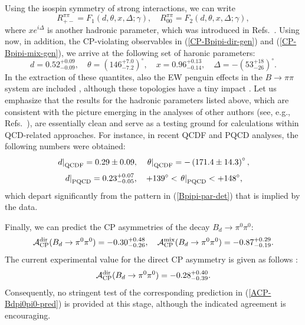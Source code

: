 \documentclass[12pt]{article}
\begin{document}
Using the isospin symmetry of strong interactions, we can write
\begin{equation}\label{Rpipi-gen}
R_{+-}^{\pi\pi}=F_1(d,\theta,x,\Delta;\gamma), \quad
R_{00}^{\pi\pi}=F_2(d,\theta,x,\Delta;\gamma),
\end{equation}
where $xe^{i\Delta}$ is another hadronic parameter, which was introduced
in Refs.~\cite{BFRS2,BFRS3}. Using now, in addition, the CP-violating observables in
(\ref{CP-Bpipi-dir-gen}) and (\ref{CP-Bpipi-mix-gen}), we arrive at the following 
set of haronic parameters:
\begin{equation}\label{Bpipi-par-det}
d=0.52^{+0.09}_{-0.09}, \quad
\theta=(146^{+7.0}_{-7.2})^\circ, \quad
x=0.96^{+0.13}_{-0.14}, \quad
\Delta=-(53^{+18}_{-26})^\circ.
\end{equation}
In the extraction of these quantites, also the EW penguin effects in the 
$B\to\pi\pi$ system are included \cite{BF98,GPY}, although these topologies have a 
tiny impact \cite{PAPIII}. Let us emphasize that the results for the hadronic 
parameters listed above, which are consistent with the picture emerging in the 
analyses of other authors (see, e.g., Refs.~\cite{ALP-Bpipi,CGRS}), 
are essentially clean and serve as a testing ground for 
calculations within QCD-related approaches. For instance, in 
recent QCDF \cite{busa} and PQCD \cite{kesa} analyses, the 
following numbers were obtained:
\begin{equation}
\left.d\right|_{\rm QCDF}=0.29\pm0.09, \quad
\left.\theta\right|_{\rm QCDF}=-\left(171.4\pm14.3\right)^\circ, 
\end{equation}
\begin{equation}
\left.d\right|_{\rm PQCD}=0.23^{+0.07}_{-0.05}, \quad
+139^\circ < \left.\theta\right|_{\rm PQCD} < +148^\circ,
\end{equation}
which depart significantly from the pattern in (\ref{Bpipi-par-det}) that is implied
by the data. 

Finally, we can predict the CP asymmetries of the decay $B_d\to\pi^0\pi^0$:
\begin{equation}\label{ACP-Bdpi0pi0-pred}
{\cal A}_{\rm CP}^{\rm dir}(B_d\to \pi^0\pi^0)=-0.30^{+0.48}_{-0.26}, \quad
{\cal A}_{\rm CP}^{\rm mix}(B_d\to \pi^0\pi^0)=-0.87^{+0.29}_{-0.19}.
\end{equation}
The current experimental value for the direct CP 
asymmetry is given as follows \cite{HFAG}:
\begin{equation}\label{ACP-Bdpi0pi0-exp}
{\cal A}_{\rm CP}^{\rm dir}(B_d\to \pi^0\pi^0)=-0.28^{+0.40}_{-0.39}.
\end{equation}
Consequently, no stringent test of the corresponding prediction 
in (\ref{ACP-Bdpi0pi0-pred}) is provided at this stage, although the 
indicated agreement is encouraging.
\end{document}
